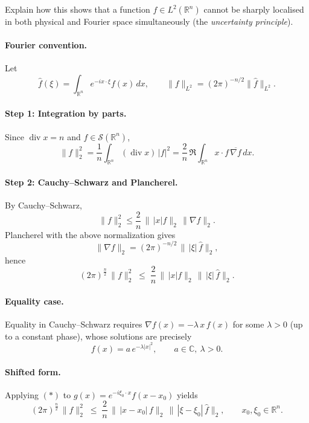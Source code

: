 \documentclass[12pt,a4paper]{article}
\theoremstyle{plain}
\theoremstyle{definition}
\theoremstyle{remark}
\theoremstyle{remark}
\begin{document}
\medskip

\noindent Explain how this shows that a function $f\in L^2(\mathbb R^n)$ cannot be sharply localised in both physical and Fourier space simultaneously (the \emph{uncertainty principle}).


\paragraph{Fourier convention.}
Let
\[
\widehat f(\xi)=\int_{\mathbb R^n} e^{-i x\cdot \xi} f(x)\,dx,
\qquad \|f\|_{L^2}=(2\pi)^{-n/2}\|\widehat f\|_{L^2}.
\]

\smallskip

\paragraph{Step 1: Integration by parts.}
Since $\operatorname{div}x=n$ and $f\in\mathcal S(\mathbb R^n)$,
\[
\|f\|_2^2
=\frac1n\int_{\mathbb R^n}(\operatorname{div}x)\,|f|^2
=\frac2n\,\Re\int_{\mathbb R^n} x\cdot f\,\overline{\nabla f}\,dx.
\]

\smallskip

\paragraph{Step 2: Cauchy--Schwarz and Plancherel.}
By Cauchy--Schwarz,
\[
\|f\|_2^2 \le \frac2n\,\|\,|x|f\|_2\,\|\nabla f\|_2.
\]
Plancherel with the above normalization gives
\[
\|\nabla f\|_2=(2\pi)^{-n/2}\,\|\,|\xi|\,\widehat f\|_2,
\]
hence
\[
(2\pi)^{\frac n2}\,\|f\|_2^2
\;\le\; \frac2n\,\|\,|x|f\|_2\,\|\,|\xi|\,\widehat f\|_2.
\tag{$\ast$}
\]

\smallskip

\paragraph{Equality case.}
Equality in Cauchy--Schwarz requires $\nabla f(x)=-\lambda\,x\,f(x)$ for some $\lambda>0$
(up to a constant phase), whose solutions are precisely
\[
f(x)=a\,e^{-\lambda|x|^2},\qquad a\in\mathbb C,\ \lambda>0.
\]

\smallskip

\paragraph{Shifted form.}
Applying $(\ast)$ to $g(x)=e^{-i\xi_0\cdot x}f(x-x_0)$ yields
\[
(2\pi)^{\frac n2}\,\|f\|_2^2
\;\le\; \frac2n\,\|\,|x-x_0|\,f\|_2\,\|\,|\xi-\xi_0|\,\widehat f\|_2,
\qquad x_0,\xi_0\in\mathbb R^n.
\]
\end{document}
